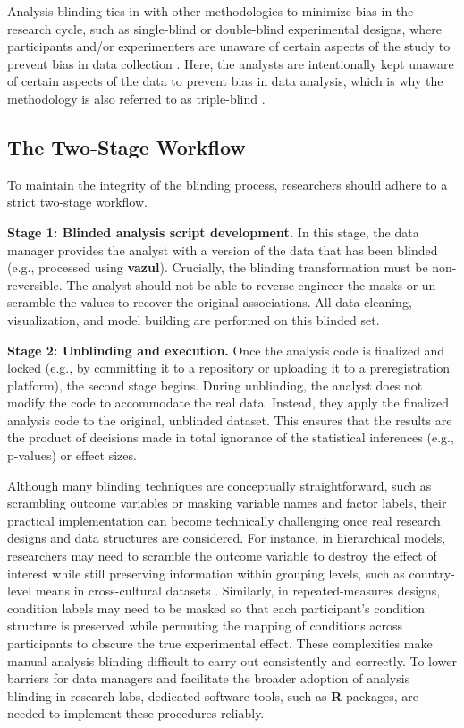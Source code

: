 Analysis blinding ties in with other methodologies to minimize bias in the research cycle, such as single-blind or double-blind experimental designs, where participants and/or experimenters are unaware of certain aspects of the study to prevent bias in data collection \citep{schulz2002blinding}. Here, the analysts are intentionally kept unaware of certain aspects of the data to prevent bias in data analysis, which is why the methodology is also referred to as triple-blind \citep{schulz2002blinding}.

\subsection{The Two-Stage Workflow}\label{the-two-stage-workflow}

To maintain the integrity of the blinding process, researchers should adhere to a strict two-stage workflow.

\textbf{Stage 1: Blinded analysis script development.} In this stage, the data manager provides the analyst with a version of the data that has been blinded (e.g., processed using \textbf{vazul}). Crucially, the blinding transformation must be non-reversible. The analyst should not be able to reverse-engineer the masks or un-scramble the values to recover the original associations. All data cleaning, visualization, and model building are performed on this blinded set.

\textbf{Stage 2: Unblinding and execution.} Once the analysis code is finalized and locked (e.g., by committing it to a repository or uploading it to a preregistration platform), the second stage begins. During unblinding, the analyst does not modify the code to accommodate the real data. Instead, they apply the finalized analysis code to the original, unblinded dataset. This ensures that the results are the product of decisions made in total ignorance of the statistical inferences (e.g., p-values) or effect sizes.

Although many blinding techniques are conceptually straightforward, such as scrambling outcome variables or masking variable names and factor labels, their practical implementation can become technically challenging once real research designs and data structures are considered. For instance, in hierarchical models, researchers may need to scramble the outcome variable to destroy the effect of interest while still preserving information within grouping levels, such as country-level means in cross-cultural datasets \citep[e.g.,][]{sarafoglou2023comparing}. Similarly, in repeated-measures designs, condition labels may need to be masked so that each participant's condition structure is preserved while permuting the mapping of conditions across participants to obscure the true experimental effect. These complexities make manual analysis blinding difficult to carry out consistently and correctly. To lower barriers for data managers and facilitate the broader adoption of analysis blinding in research labs, dedicated software tools, such as \textbf{R} packages, are needed to implement these procedures reliably.

